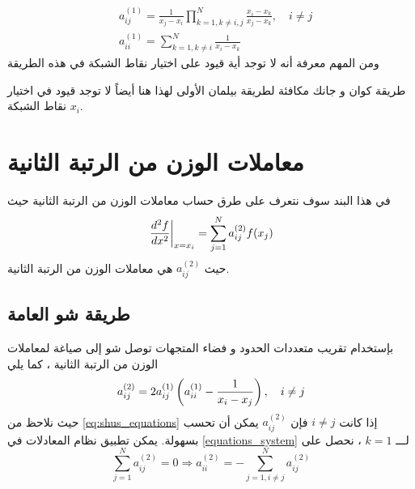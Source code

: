 \begin{equation}
	\label{quan_chang_equations}
	\begin{aligned}
		& a_{ij}^{(1)}=\frac{1}{x_j-x_i}\prod_{k=1,k\neq i,j}^{N}\frac{x_i-x_k}{x_j-x_k},\quad i\neq j \\
		& a_{ii}^{(1)}=\sum_{k=1,k\neq i}^{N}\frac{1}{x_i-x_k}
	\end{aligned}
\end{equation}
ومن المهم معرفة أنه لا توجد أية قيود على اختيار نقاط الشبكة في هذه الطريقة

\begin{note}
	طريقة كوان و جانك مكافئة لطريقة بيلمان الأولى لهذا هنا أيضاً لا توجد قيود في اختيار نقاط الشبكة $x_i$.
\end{note}

\section[معاملات الوزن من الرتبة الثانية]{معاملات الوزن من الرتبة الثانية }

في هذا البند سوف نتعرف على طرق حساب معاملات الوزن من الرتبة الثانية حيث
\begin{equation}
	\label{eq:DQM_formula_order2}
	\left.\frac{d^2f}{dx^2}\right|_{x=x_i}=\sum_{j=1}^{N}a_{ij}^{(2)}f(x_j)
\end{equation}
حيث $a_{ij}^{(2)}$ هي معاملات الوزن من الرتبة الثانية.

\subsection[طريقة شو العامة]{طريقة شو العامة \cite{chang_shu} }
بإستخدام تقريب متعددات الحدود و فضاء المتجهات توصل شو إلى صياغة لمعاملات الوزن من الرتبة الثانية ، كما يلي
\begin{equation}
	\label{eq:shus_equations}
	a_{ij}^{(2)}=2a_{ij}^{(1)}\left(a_{ii}^{(1)}-\frac{1}{x_i-x_j}\right),\quad i\not=j
\end{equation}
حيث نلاحظ من \eqref{eq:shus_equations} إذا كانت $i\neq j$ فإن $a_{ij}^{(2)}$ يمكن أن تحسب بسهولة. يمكن تطبيق نظام المعادلات في \eqref{equations_system} لـــ $k=1$ ، نحصل على
\[
\sum_{j=1}^{N}a_{ij}^{(2)}=0\Longrightarrow a_{ii}^{(2)}=-\sum_{j=1,i\neq j}^{N}a_{ij}^{(2)}
\]


